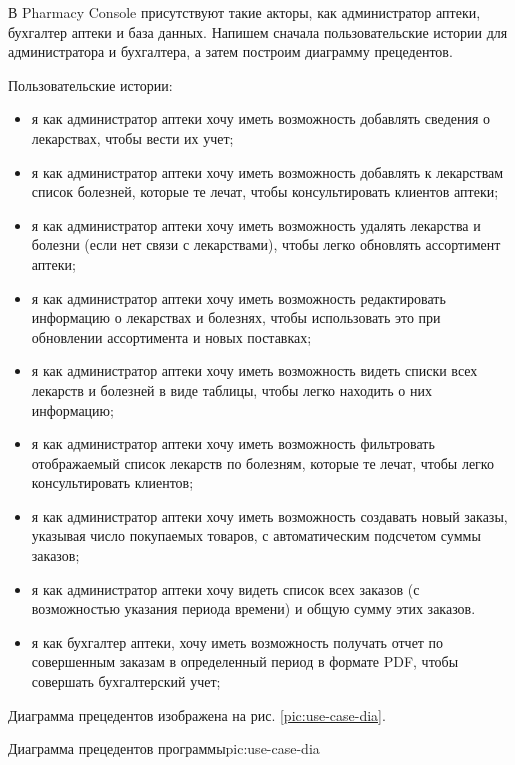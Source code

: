 В Pharmacy Console присутствуют такие акторы, как администратор аптеки,
бухгалтер аптеки и база данных. Напишем сначала пользовательские истории для
администратора и бухгалтера, а затем построим диаграмму прецедентов.

Пользовательские истории:
\begin{itemize}
    \item я как администратор аптеки хочу иметь возможность добавлять сведения
        о лекарствах, чтобы вести их учет;
    \item я как администратор аптеки хочу иметь возможность добавлять к
        лекарствам список болезней, которые те лечат, чтобы консультировать
        клиентов аптеки;
    \item я как администратор аптеки хочу иметь возможность удалять лекарства
        и болезни (если нет связи с лекарствами), чтобы легко обновлять
        ассортимент аптеки;
    \item я как администратор аптеки хочу иметь возможность редактировать
        информацию о лекарствах и болезнях, чтобы использовать это при
        обновлении ассортимента и новых поставках;
    \item я как администратор аптеки хочу иметь возможность видеть списки всех
        лекарств и болезней в виде таблицы, чтобы легко находить о них
        информацию;
    \item я как администратор аптеки хочу иметь возможность фильтровать
        отображаемый список лекарств по болезням, которые те лечат, чтобы легко
        консультировать клиентов;
    \item я как администратор аптеки хочу иметь возможность создавать новый
        заказы, указывая число покупаемых товаров, с автоматическим подсчетом
        суммы заказов;
    \item я как администратор аптеки хочу видеть список всех заказов (с
        возможностью указания периода времени) и общую сумму этих заказов.
    \item я как бухгалтер аптеки, хочу иметь возможность получать отчет по
        совершенным заказам в определенный период в формате PDF, чтобы
        совершать бухгалтерский учет;
\end{itemize}

Диаграмма прецедентов изображена на рис. \ref{pic:use-case-dia}.

{Диаграмма прецедентов программы}{pic:use-case-dia}




